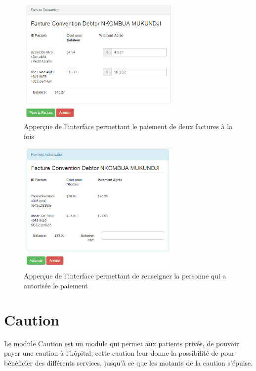 \documentclass[12pt,a4paper]{report}
\begin{document}
\newpage

\begin{figure}[h]
\begin{center}
\includegraphics[width=8cm]{pic/DoubleConvention.png}
\end{center}
\caption{Apperçue de l'interface permettant le paiement de deux factures à la fois}
\label{Apperçue de l'interface permettant le paiement de deux factures à la fois}
\end{figure}


\begin{figure}[h]
\begin{center}
\includegraphics[width=8cm]{pic/PCConfirm.png}
\end{center}
\caption{Apperçue de l'interface permettant de renseigner la personne qui a autorisée le paiement}
\label{Apperçue de l'interface permettant de renseigner la personne qui a autorisée le paiement}
\end{figure}



\newpage
\section{Caution}
Le module Caution est un module qui permet aux patients privés, de pouvoir payer une caution à l'hôpital, cette caution leur donne la possibilité de pour bénéficier des différents services, jusqu'à ce que les motants de la caution s'épuise.
\end{document}
